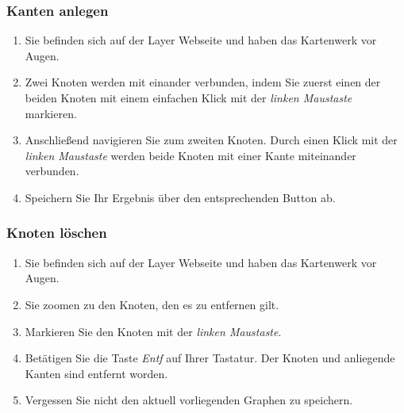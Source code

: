 \subsubsection*{Kanten anlegen}
\label{Kanten anlegen}
\begin{enumerate}
\item Sie befinden sich auf der Layer Webseite und haben das Kartenwerk vor Augen.
\item Zwei Knoten werden mit einander verbunden, indem Sie zuerst einen der beiden Knoten mit einem einfachen Klick mit der \textit{linken Maustaste} markieren.
\item Anschließend navigieren Sie zum zweiten Knoten. Durch einen Klick mit der \textit{linken Maustaste} werden beide Knoten mit einer Kante miteinander verbunden.
\item Speichern Sie Ihr Ergebnis über den entsprechenden Button ab.
\end{enumerate}
\subsubsection*{Knoten löschen}
\label{Knoten loeschen}
\begin{enumerate}
\item Sie befinden sich auf der Layer Webseite und haben das Kartenwerk vor Augen.
\item Sie zoomen zu den Knoten, den es zu entfernen gilt.
\item Markieren Sie den Knoten mit der \textit{linken Maustaste}.
\item Betätigen Sie die Taste \textit{Entf} auf Ihrer Tastatur. Der Knoten und anliegende Kanten sind entfernt worden.
\item Vergessen Sie nicht den aktuell vorliegenden Graphen zu speichern.
\end{enumerate}
